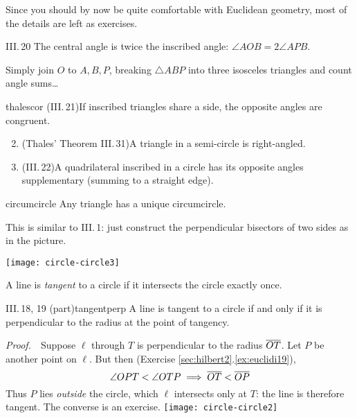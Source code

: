 Since you should by now be quite comfortable with Euclidean geometry, most of the details are left as exercises.

\begin{thm}{III.\,20}{}
The central angle is twice the inscribed angle: $\angle AOB=2\angle APB$.
\end{thm}

Simply join $O$ to $A,B,P$, breaking $\triangle ABP$ into three isosceles triangles and count angle sums\ldots

\begin{cor}{}{thalescor}
\exstart (III.\,21)\lstsp If inscribed triangles share a side, the opposite angles are congruent.
\begin{enumerate}\setcounter{enumi}{1}
	\item (Thales' Theorem III.\,31)\lstsp A triangle in a semi-circle is right-angled.
	\item (III.\,22)\lstsp A quadrilateral inscribed in a circle has its opposite angles supplementary (summing to a straight edge).
\end{enumerate}
\end{cor}

\begin{minipage}[t]{0.62\linewidth}\vspace{0pt}
\begin{thm}{}{circumcircle}
Any triangle has a unique circumcircle.
\end{thm}

This is similar to III.\,1: just construct the perpendicular bisectors of two sides as in the picture. 
\end{minipage}\begin{minipage}[t]{0.38\linewidth}\vspace{0pt}
\flushright\texttt{[image: circle-circle3]}
\end{minipage}


\begin{defn}{}{}
A line is \emph{tangent} to a circle if it intersects the circle exactly once.
\end{defn}

\begin{thm}{III.\,18, 19 (part)}{tangentperp}
A line is tangent to a circle if and only if it is perpendicular to the radius at the point of tangency.
\end{thm}\goodbreak

\begin{tcolorbox}[proofstyle, lower separated=false, sidebyside, sidebyside align=top seam, sidebyside gap=0pt, righthand width=0.35\linewidth]
\emph{Proof.}\ \ Suppose $\ell$ through $T$ is perpendicular to the radius $\overline{OT}$.\smallbreak
Let $P$ be another point on $\ell$. But then (Exercise \ref*{sec:hilbert2}.\ref{ex:euclidi19}),
\[\angle OPT<\angle OTP\implies \overline{OT}<\overline{OP}\]
Thus $P$ lies \emph{outside} the circle, which $\ell$ intersects only at $T$: the line is therefore tangent.\medbreak
The converse is an exercise.
\tcblower
\flushright\texttt{[image: circle-circle2]}\\[-8pt]\hfill\qedsymbol
\end{tcolorbox}

